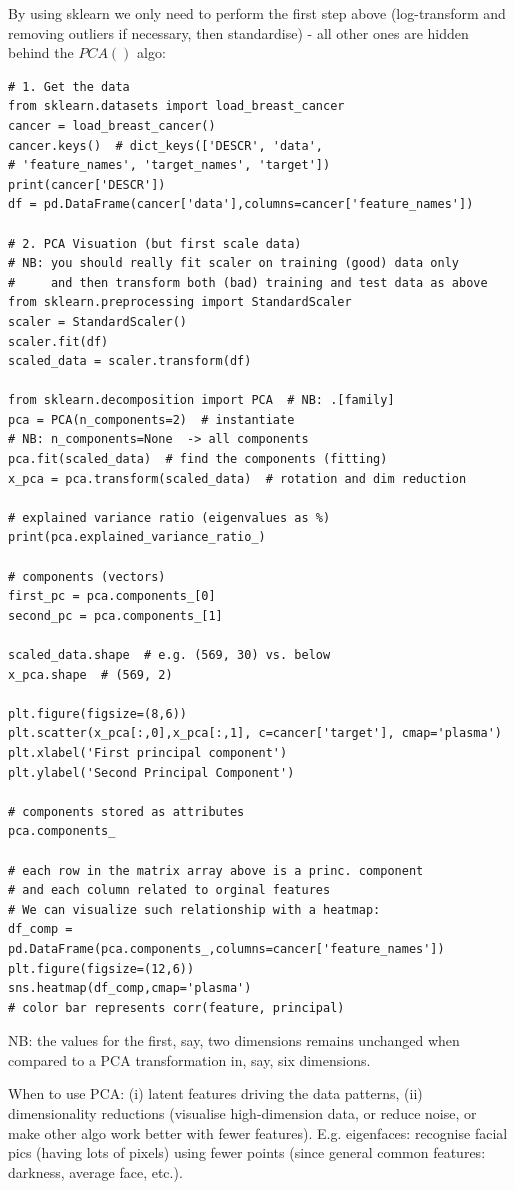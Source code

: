 \documentclass[11pt]{article}
\begin{document}
By using sklearn we only need to perform the first step above (log-transform and removing outliers if necessary,  then standardise) - all other ones are hidden behind the $PCA()$ algo:
\begin{lstlisting}
# 1. Get the data
from sklearn.datasets import load_breast_cancer
cancer = load_breast_cancer()
cancer.keys()  # dict_keys(['DESCR', 'data', 
# 'feature_names', 'target_names', 'target'])
print(cancer['DESCR'])
df = pd.DataFrame(cancer['data'],columns=cancer['feature_names'])

# 2. PCA Visuation (but first scale data)
# NB: you should really fit scaler on training (good) data only
#     and then transform both (bad) training and test data as above
from sklearn.preprocessing import StandardScaler
scaler = StandardScaler() 
scaler.fit(df)
scaled_data = scaler.transform(df)

from sklearn.decomposition import PCA  # NB: .[family]
pca = PCA(n_components=2)  # instantiate
# NB: n_components=None  -> all components
pca.fit(scaled_data)  # find the components (fitting)
x_pca = pca.transform(scaled_data)  # rotation and dim reduction

# explained variance ratio (eigenvalues as %)
print(pca.explained_variance_ratio_)

# components (vectors)
first_pc = pca.components_[0]
second_pc = pca.components_[1]

scaled_data.shape  # e.g. (569, 30) vs. below
x_pca.shape  # (569, 2)  

plt.figure(figsize=(8,6))
plt.scatter(x_pca[:,0],x_pca[:,1], c=cancer['target'], cmap='plasma')
plt.xlabel('First principal component')
plt.ylabel('Second Principal Component')

# components stored as attributes
pca.components_

# each row in the matrix array above is a princ. component
# and each column related to orginal features
# We can visualize such relationship with a heatmap:
df_comp = pd.DataFrame(pca.components_,columns=cancer['feature_names'])
plt.figure(figsize=(12,6))
sns.heatmap(df_comp,cmap='plasma')
# color bar represents corr(feature, principal)
\end{lstlisting}
NB: the values for the first, say, two dimensions remains unchanged when compared to a PCA transformation in, say, six dimensions.

When to use PCA: (i) latent features driving the data patterns, (ii) dimensionality reductions (visualise high-dimension data, or reduce noise, or make other algo work better with fewer features). E.g. eigenfaces: recognise facial pics (having lots of pixels) using fewer points (since general common features: darkness, average face, etc.).
\end{document}
